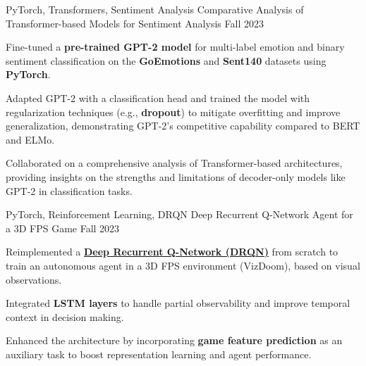 \begin{cventries}
\cventry
    {PyTorch, Transformers, Sentiment Analysis} %
    {Comparative Analysis of Transformer-based Models for Sentiment Analysis} %
    {} %
    {Fall 2023} %
    {
      \begin{cvitems}
        \item {Fine-tuned a \textbf{pre-trained GPT-2 model} for multi-label emotion and binary sentiment classification on the \textbf{GoEmotions} and \textbf{Sent140} datasets using \textbf{PyTorch}.}
        \item {Adapted GPT-2 with a classification head and trained the model with regularization techniques (e.g., \textbf{dropout}) to mitigate overfitting and improve generalization, demonstrating GPT-2's competitive capability compared to BERT and ELMo.}
        \item {Collaborated on a comprehensive analysis of Transformer-based architectures, providing insights on the strengths and limitations of decoder-only models like GPT-2 in classification tasks.}
      \end{cvitems}
    }

\cventry
    {PyTorch, Reinforcement Learning, DRQN} %
    {Deep Recurrent Q-Network Agent for a 3D FPS Game} %
    {} %
    {Fall 2023} %
    {
      \begin{cvitems}
        \item {Reimplemented a \textbf{\href{https://arxiv.org/pdf/1609.05521}{Deep Recurrent Q-Network (DRQN)}} from scratch to train an autonomous agent in a 3D FPS environment (VizDoom), based on visual observations.}
        \item {Integrated \textbf{LSTM layers} to handle partial observability and improve temporal context in decision making.}
        \item {Enhanced the architecture by incorporating \textbf{game feature prediction} as an auxiliary task to boost representation learning and agent performance.}
      \end{cvitems}
    }



\end{cventries}
